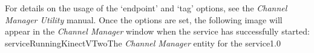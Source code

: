 For details on the usage of the `endpoint' and `tag' options, see the \emph{Channel
Manager Utility} manual.
Once the options are set, the following image will appear in the \emph{Channel Manager}
window when the service has successfully started:
%
{serviceRunningKinectVTwo}{The \emph{Channel Manager} entity for the \KVtwoI{} service}{1.0}
\secondaryEnd
\primaryEnd{}

